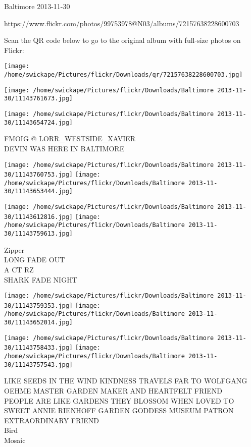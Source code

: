 \documentclass[10pt,letterpaper]{article}
\begin{document}
Baltimore 2013-11-30

https://www.flickr.com/photos/99753978@N03/albums/72157638228600703

Scan the QR code below to go to the original album with full-size photos on Flickr:

\texttt{[image: /home/swickape/Pictures/flickr/Downloads/qr/72157638228600703.jpg]}
\pagebreak

\texttt{[image: /home/swickape/Pictures/flickr/Downloads/Baltimore 2013-11-30/11143761673.jpg]}

\vspace{0.25in}
\texttt{[image: /home/swickape/Pictures/flickr/Downloads/Baltimore 2013-11-30/11143654724.jpg]}

FMOIG @ LORR\_WESTSIDE\_XAVIER\\
DEVIN WAS HERE IN BALTIMORE\\
\pagebreak

\texttt{[image: /home/swickape/Pictures/flickr/Downloads/Baltimore 2013-11-30/11143760753.jpg]}
\texttt{[image: /home/swickape/Pictures/flickr/Downloads/Baltimore 2013-11-30/11143653444.jpg]}

\texttt{[image: /home/swickape/Pictures/flickr/Downloads/Baltimore 2013-11-30/11143612816.jpg]}
\texttt{[image: /home/swickape/Pictures/flickr/Downloads/Baltimore 2013-11-30/11143759613.jpg]}

Zipper\\
LONG FADE OUT\\
A CT RZ\\
SHARK FADE NIGHT\\
\pagebreak

\texttt{[image: /home/swickape/Pictures/flickr/Downloads/Baltimore 2013-11-30/11143759353.jpg]}
\texttt{[image: /home/swickape/Pictures/flickr/Downloads/Baltimore 2013-11-30/11143652014.jpg]}

\texttt{[image: /home/swickape/Pictures/flickr/Downloads/Baltimore 2013-11-30/11143758433.jpg]}
\texttt{[image: /home/swickape/Pictures/flickr/Downloads/Baltimore 2013-11-30/11143757543.jpg]}

LIKE SEEDS IN THE WIND KINDNESS TRAVELS FAR TO WOLFGANG OEHME MASTER GARDEN MAKER AND HEARTFELT FRIEND\\
PEOPLE ARE LIKE GARDENS THEY BLOSSOM WHEN LOVED TO SWEET ANNIE RIENHOFF GARDEN GODDESS MUSEUM PATRON EXTRAORDINARY FRIEND\\
Bird\\
Mosaic\\
\pagebreak
\end{document}
